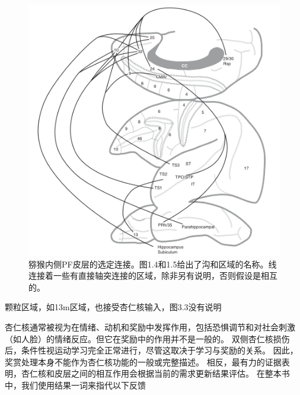 \begin{figure}[!htb]
	\centering
	\includegraphics{image_pfc/Fig_3_2}
	\caption{猕猴内侧PF皮层的选定连接。图1.4和1.5给出了沟和区域的名称。线连接着一些有直接轴突连接的区域，除非另有说明，否则假设是相互的。}
	\label{fig:fig}
\end{figure}


\cite{Prather et al.2001;Morecraft et al.2007}颗粒区域，如13m区域，也接受杏仁核输入，图3.3没有说明\cite{Saleem et al.2008}\par
杏仁核通常被视为在情绪、动机和奖励中发挥作用，包括恐惧调节和对社会刺激（如人脸）的情绪反应。但它在奖励中的作用并不是一般的。
双侧杏仁核损伤后，条件性视运动学习完全正常进行，尽管这取决于学习与奖励的关系\cite{Murray&Wise 1996}。
因此，奖赏处理本身不能作为杏仁核功能的一般或完整描述。
相反，最有力的证据表明，杏仁核和皮层之间的相互作用会根据当前的需求更新结果评估\cite{Baxter&Murray,2002}。
在整本书中，我们使用结果一词来指代以下反馈\par


